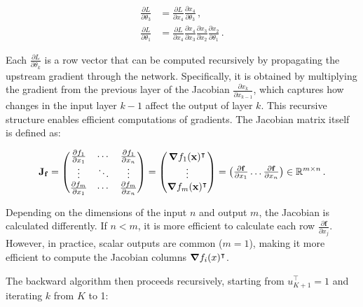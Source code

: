 \begin{align}
\label{eq:backprop_example_backwardpass}
	\frac{\partial L}{\partial \theta_3} & = \frac{\partial L}{\partial x_4} \frac{\partial x_4}{\partial \theta_3} \,,\\
	\frac{\partial L}{\partial \theta_1} & = \frac{\partial L}{\partial x_4} \frac{\partial x_4}{\partial x_3} \frac{\partial x_3}{\partial x_2} \frac{\partial x_2}{\partial \theta_1} \,.
\end{align}

Each $\frac{\partial L}{\partial \theta_k}$ is a row vector that can be computed recursively by propagating the upstream gradient through the network. Specifically, it is obtained by multiplying the gradient from the previous layer of the Jacobian $\frac{\partial x_k}{\partial x_{k-1}}$, which captures how changes in the input layer $k -1$ affect the output of layer $k$. This recursive structure enables efficient computations of gradients.
The Jacobian matrix itself is defined as:


\begin{equation}
\label{eq:backprop_jacobian}
	\mathbf{J_f} =  
\begin{pmatrix} 
\frac{\partial f_1}{\partial x_1} & \cdots & \frac{\partial f_1}{\partial x_n} \\
\vdots & \ddots & \vdots \\
\frac{\partial f_m}{\partial x_1} & \cdots &  \frac{\partial f_m}{\partial x_n} \\
\end{pmatrix} 
	= \begin{pmatrix} \grad f_1 (\mathbf{x})^{\intercal} \\ \vdots \\ \grad f_m(\mathbf{x})^{\intercal} \end{pmatrix}
	= \begin{pmatrix} \frac{\partial \mathbf{f}}{\partial x_1 } \ldots \frac{\partial \mathbf{f}}{\partial x_n}\end{pmatrix} \in \mathbb{R}^{m \times n} \,.
\end{equation}

Depending on the dimensions of the input $n$ and output $m$, the Jacobian is calculated differently. If $n < m$, it is more efficient to calculate each row $\frac{\partial \mathbf{f}}{\partial x_j}$. 
However, in practice, scalar outputs are common ($m = 1$), making it more efficient to compute the Jacobian columns $\grad f_i(x)^{\intercal}$. 

The backward algorithm then proceeds recursively, starting from $u_{K+1}^{\intercal} = 1$ and iterating $k$ from $K$ to 1:

